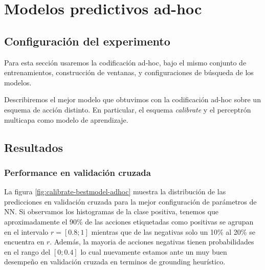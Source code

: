 

\section{Modelos predictivos ad-hoc}
\label{exp:wb}

\subsection{Configuración del experimento}

Para esta sección usaremos la codificación ad-hoc, bajo el mismo conjunto de
entrenamientos, construcción de ventanas, y configuraciones de búsqueda de los
modelos.

Describiremos el mejor modelo que obtuvimos con la codificación ad-hoc sobre un
esquema de acción distinto. En particular, el esquema \emph{calibrate} y el
perceptrón multicapa como modelo de aprendizaje.

\subsection{Resultados}

\subsubsection{Performance en validación cruzada}

La figura \ref{fig:calibrate-bestmodel-adhoc} muestra la distribución de las
predicciones en validación cruzada para la mejor configuración de parámetros de
NN. Si observamos los histogramas de la clase positiva, tenemos que
aproximadamente el 90\% de las acciones etiquetadas como positivas se agrupan en
el intervalo $r = [0.8; 1]$ mientras que de las negativas solo un 10\% al 20\%
se encuentra en $r$. Además, la mayoria de acciones negativas tienen
probabilidades en el rango del $[0;0.4]$ lo cual nuevamente estamos ante un muy
buen desempeño en validación cruzada en terminos de grounding heurístico.

